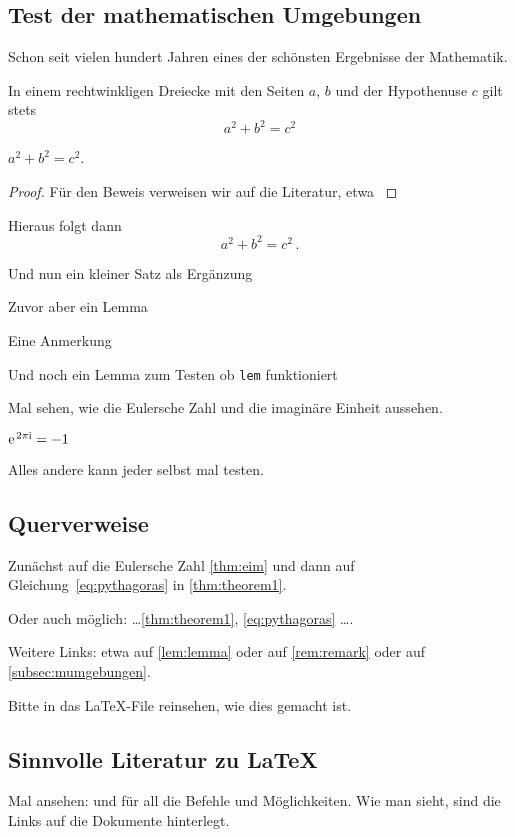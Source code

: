 \subsection{Test der mathematischen Umgebungen}\label{subsec:mumgebungen}
Schon seit vielen hundert Jahren eines der schönsten Ergebnisse der Mathematik.
%
\begin{theorem}\label{thm:theorem1}
In einem rechtwinkligen Dreiecke mit den Seiten $ a $, $ b $ und der Hypothenuse $ c $ gilt stets
\begin{equation}\label{eq:pythagoras}
a^{ 2 } +b^{ 2 } = c^{ 2 }
\end{equation}

$	a^{ 2 } +b^{ 2 } = c^{ 2 } $.
\end{theorem}
%
\begin{proof}
Für den Beweis verweisen wir auf die Literatur, etwa \textcite{efhn:2016}
\end{proof}
\begin{corollary}\label{cor:folgerung}
Hieraus folgt dann 
%
\[
	a^{ 2 } + b^{ 2 } = c^{ 2 } \, .
\]
%
\end{corollary}
%
\begin{proposition}\label{prop:prop}
Und nun ein kleiner Satz als Ergänzung 
\end{proposition}
%
\begin{lemma}\label{lem:lemma}
Zuvor aber ein Lemma
\end{lemma}
%
\begin{remark}\label{rem:remark}
Eine Anmerkung
\end{remark}
\begin{lem}\label{lem:lemma}
Und noch ein Lemma zum Testen ob \texttt{lem} funktioniert
\end{lem}
Mal sehen, wie die Eulersche Zahl und die imaginäre Einheit aussehen.
\begin{theorem}\label{thm:eim}
$ \mathrm{e\;\!}^{ 2 \pi \mathrm{i} } = -1 $
\end{theorem}
Alles andere kann jeder selbst mal testen.
%
\newpage
\subsection{Querverweise}\label{subsec:referenzen}
%
Zunächst auf die Eulersche Zahl \vref{thm:eim} und dann auf Gleichung~\eqref{eq:pythagoras} in \vref{thm:theorem1}.

Oder auch möglich: \ldots \cref{thm:theorem1}, \vref{eq:pythagoras} \ldots.

Weitere Links: etwa auf \vref{lem:lemma} oder auf \vref{rem:remark} oder auf \vref{subsec:mumgebungen}.

Bitte in das \LaTeX-File reinsehen, wie dies gemacht ist.
%
\subsection{Sinnvolle Literatur zu \LaTeX}
%
Mal ansehen: \textcite{l2tabu} und \textcite{lshort-german} \bzw \textcite{latex-refsheet} für all die Befehle und Möglichkeiten.
Wie man sieht, sind die Links auf die Dokumente hinterlegt.


